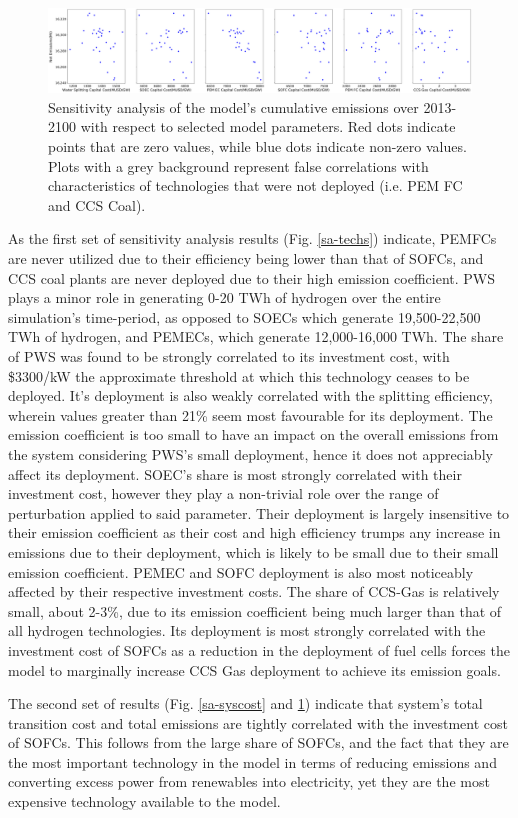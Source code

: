 \begin{figure}[h] 
\centering
\hspace*{-3cm}
\includegraphics[scale=0.14]{figures/co2emi}
\caption{Sensitivity analysis of the model's cumulative emissions over 2013-2100 with respect to selected model parameters. Red dots indicate points that are zero values, while blue dots indicate non-zero values. Plots with a grey background represent false correlations with characteristics of technologies that were not deployed (i.e. PEM FC and CCS Coal).}
\label{sa-co2}
\end{figure}

As the first set of sensitivity analysis results (Fig. \ref{sa-techs}) indicate, \gls{PEMFC}s are never utilized due to their efficiency being lower than that of \gls{SOFC}s, and \gls{CCS} coal plants are never deployed due to their high emission coefficient. \gls{PWS} plays a minor role in generating 0-20 TWh of hydrogen over the entire simulation's time-period, as opposed to \gls{SOEC}s which generate 19,500-22,500 TWh of hydrogen, and \gls{PEMEC}s, which generate 12,000-16,000 TWh. The share of \gls{PWS} was found to be strongly correlated to its investment cost, with \$3300/kW the approximate threshold at which this technology ceases to be deployed. It's deployment is also weakly correlated with the splitting efficiency, wherein values greater than 21\% seem most favourable for its deployment. The emission coefficient is too small to have an impact on the overall emissions from the system considering \gls{PWS}'s small deployment, hence it does not appreciably affect its deployment. \gls{SOEC}'s share is most strongly correlated with their investment cost, however they play a non-trivial role over the range of perturbation applied to said parameter. Their deployment is largely insensitive to their emission coefficient as their cost and high efficiency trumps any increase in emissions due to their deployment, which is likely to be small due to their small emission coefficient. \gls{PEMEC} and \gls{SOFC} deployment is also most noticeably affected by their respective investment costs. The share of \gls{CCS}-Gas is relatively small, about 2-3\%, due to its emission coefficient being much larger than that of all hydrogen technologies. Its deployment is most strongly correlated with the investment cost of \gls{SOFC}s as a reduction in the deployment of fuel cells forces the model to marginally increase CCS Gas deployment to achieve its emission goals.

The second set of results (Fig. \ref{sa-syscost} and \ref{sa-co2}) indicate that system's total transition cost and total emissions are tightly correlated with the investment cost of \gls{SOFC}s. This follows from the large share of \gls{SOFC}s, and the fact that they are the most important technology in the model in terms of reducing emissions and converting excess power from renewables into electricity, yet they are the most expensive technology available to the model.